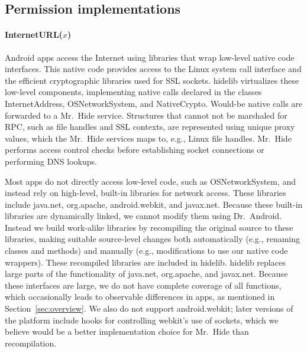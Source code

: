 \documentclass[preprint]{sig-alternate-10pt}
\newcommand{\code}[1]{\textsf{#1}}
\newcommand{\lib}{Mr.\ Hide\xspace}
\newcommand{\rewriter}{Dr.\ Android\xspace}
\newcommand{\bnsp}{\hspace{0pt}} %
\begin{document}
\subsection{Permission implementations}

\paragraph*{InternetURL($x$)} 


Android apps access the Internet using libraries that wrap low-level native
code interfaces.  This native code provides
access to the Linux system call interface and the
efficient cryptographic libraries
used for SSL sockets.
\code{hidelib} virtualizes these low-level components,
implementing native calls 
declared in the classes \code{InternetAddress},
\code{OSNetworkSystem}, and \code{NativeCrypto}.  Would-be native calls are 
forwarded to a \lib service.  Structures that cannot not be marshaled for RPC, such as file handles and SSL
contexts, are represented using
unique proxy values, which the \lib services maps to, e.g., Linux file
handles.
%
\lib performs access control checks before
establishing socket connections or performing DNS lookups.


Most apps do not directly access low-level code, such as
\code{OSNetworkSystem}, and instead rely on high-level, built-in
libraries for network access.  These libraries
include
\code{java.net},
\code{org.apache}, \code{android.webkit}, and 
\code{javax.net}.  
Because these
built-in libraries are dynamically linked, we cannot modify them using
\rewriter.  Instead we build work-alike libraries by recompiling the
original source to these libraries, making suitable source-level changes both
automatically (e.g., renaming classes and methods) and manually (e.g.,
modifications to use our native code wrappers). These recompiled libraries are included in \code{hidelib}.
\code{hidelib} replaces large parts of the functionality of
\code{java.\bnsp{}net},
\code{org.\bnsp{}apache}, and
\code{javax.\bnsp{}net}. Because these interfaces are large, we do not
have complete coverage of all functions, which occasionally leads to
observable differences in apps, as mentioned in
Section~\ref{sec:overview}. We also do not support
\code{android.webkit}; later versions of the platform
include hooks for controlling webkit's use of sockets, which we believe
would be a better implementation choice for \lib than recompilation.
\end{document}
